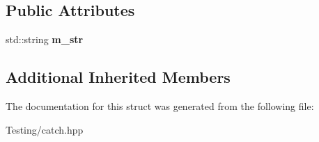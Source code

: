 \subsection*{Public Attributes}
\begin{DoxyCompactItemize}
\item 
\hypertarget{struct_catch_1_1_matchers_1_1_impl_1_1_std_string_1_1_equals_a41fc4413185f47d8b6d8da7a55078921}{std\-::string {\bfseries m\-\_\-str}}\label{struct_catch_1_1_matchers_1_1_impl_1_1_std_string_1_1_equals_a41fc4413185f47d8b6d8da7a55078921}

\end{DoxyCompactItemize}
\subsection*{Additional Inherited Members}


The documentation for this struct was generated from the following file\-:\begin{DoxyCompactItemize}
\item 
Testing/catch.\-hpp\end{DoxyCompactItemize}
